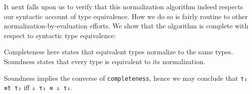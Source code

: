 \documentclass[authoryear, acmsmall, screen, review, nonacm]{acmart}
\begin{document}
It next falls upon us to verify that this normalization algorithm indeed respects our syntactic account of type equivalence. How we do so is fairly routine to other normalization-by-evaluation efforts. We show that the algorithm is complete with respect to syntactic type equivalence:

\begin{code}%
\>[0]\AgdaSpace{}%
\AgdaSymbol{:}\AgdaSpace{}%
\AgdaSpace{}%
\AgdaSymbol{\{}\AgdaSpace{}%
\AgdaSpace{}%
\AgdaSymbol{:}\AgdaSpace{}%
\AgdaSpace{}%
\AgdaSpace{}%
\AgdaSymbol{\}}\AgdaSpace{}%
\AgdaSpace{}%
\AgdaSpace{}%
\AgdaSpace{}%
\AgdaSpace{}%
\AgdaSpace{}%
\AgdaSpace{}%
\AgdaSpace{}%
\AgdaSpace{}%
\AgdaSpace{}%
\<%
\end{code}
\begin{code}[hide]%
\>[0]\AgdaSpace{}%
\AgdaSymbol{=}\AgdaSpace{}%
\AgdaSpace{}%
\AgdaSymbol{\AgdaUnderscore{}}\<%
\end{code}

\Ni Completeness here states that equivalent types normalize to the same types. Soundness states that every type is equivalent to its normalization.

\begin{code}%
\>[0]\AgdaSpace{}%
\AgdaSymbol{:}\AgdaSpace{}%
\AgdaSpace{}%
\AgdaSymbol{\{}\AgdaSpace{}%
\AgdaSymbol{\}}\AgdaSpace{}%
\AgdaSpace{}%
\AgdaSymbol{(}\AgdaSpace{}%
\AgdaSymbol{:}\AgdaSpace{}%
\AgdaSpace{}%
\AgdaSpace{}%
\AgdaSymbol{)}\AgdaSpace{}%
\AgdaSpace{}%
\AgdaSpace{}%
\AgdaSpace{}%
\AgdaSpace{}%
\AgdaSymbol{(}\AgdaSpace{}%
\AgdaSymbol{)}\<%
\end{code}
\begin{code}[hide]%
\>[0]\AgdaSpace{}%
\AgdaSymbol{=}\AgdaSpace{}%
\AgdaSpace{}%
\AgdaSymbol{\AgdaUnderscore{}}\<%
\end{code}

Soundness implies the converse of \verb!completeness!, hence we may conclude that \verb!τ₁ ≡t τ₂! iff \verb!⇓ τ₁ ≡ ⇓ τ₂!.
\end{document}
